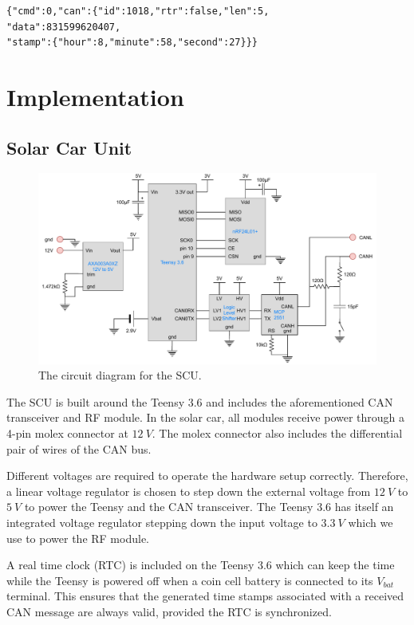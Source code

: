 \documentclass[a4paper,conference]{IEEEtran}
\begin{document}
\begin{lstlisting}[caption={Example of a JSON string.},captionpos=b,label={lst:json}]
{"cmd":0,"can":{"id":1018,"rtr":false,"len":5,
"data":831599620407,
"stamp":{"hour":8,"minute":58,"second":27}}}
\end{lstlisting}

\section{Implementation}
\subsection{Solar Car Unit}

\begin{figure}
    \centering
    \includegraphics[width=\linewidth]{documentation/images/SCU_CircuitDiagram.pdf}
    \caption{The circuit diagram for the SCU.}
    \label{fig:SCU_circuit}
\end{figure}

The SCU is built around the Teensy 3.6 and includes the aforementioned CAN transceiver and RF module. In the solar car, all modules receive power through a 4-pin molex connector at $\SI{12}{V}$. The molex connector also includes the differential pair of wires of the CAN bus. 

Different voltages are required to operate the hardware setup correctly. Therefore, a linear voltage regulator is chosen to step down the external voltage from $\SI{12}{V}$ to $\SI{5}{V}$ to power the Teensy and the CAN transceiver. The Teensy 3.6 has itself an integrated voltage regulator stepping down the input voltage to $\SI{3.3}{V}$ which we use to power the RF module.

A real time clock (RTC) is included on the Teensy 3.6 which can keep the time while the Teensy is powered off when a coin cell battery is connected to its $V_{bat}$ terminal. This ensures that the generated time stamps associated with a received CAN message are always valid, provided the RTC is synchronized. 
\end{document}
